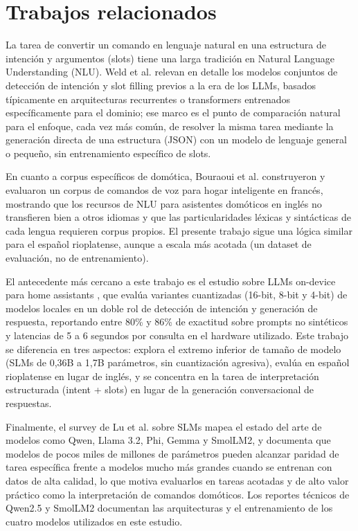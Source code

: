 \section{Trabajos relacionados}

La tarea de convertir un comando en lenguaje natural en una estructura de
intención y argumentos (slots) tiene una larga tradición en Natural Language
Understanding (NLU). Weld et al. \cite{weld2023survey} relevan en detalle
los modelos conjuntos de detección de intención y slot filling previos a la
era de los LLMs, basados típicamente en arquitecturas recurrentes o
transformers entrenados específicamente para el dominio; ese marco es el
punto de comparación natural para el enfoque, cada vez más común, de
resolver la misma tarea mediante la generación directa de una estructura
(JSON) con un modelo de lenguaje general o pequeño, sin entrenamiento
específico de slots.

En cuanto a corpus específicos de domótica, Bouraoui et al.
\cite{bouraoui2018french} construyeron y evaluaron un corpus de comandos de
voz para hogar inteligente en francés, mostrando que los recursos de NLU
para asistentes domóticos en inglés no transfieren bien a otros idiomas y
que las particularidades léxicas y sintácticas de cada lengua requieren
corpus propios. El presente trabajo sigue una lógica similar para el
español rioplatense, aunque a escala más acotada (un dataset de evaluación,
no de entrenamiento).

El antecedente más cercano a este trabajo es el estudio sobre LLMs
on-device para home assistants \cite{ondevice2025homeassistant}, que evalúa
variantes cuantizadas (16-bit, 8-bit y 4-bit) de modelos locales en un doble
rol de detección de intención y generación de respuesta, reportando entre
80\% y 86\% de exactitud sobre prompts no sintéticos y latencias de 5 a 6
segundos por consulta en el hardware utilizado. Este trabajo se diferencia
en tres aspectos: explora el extremo inferior de tamaño de modelo (SLMs de
0,36B a 1,7B parámetros, sin cuantización agresiva), evalúa en español
rioplatense en lugar de inglés, y se concentra en la tarea de interpretación
estructurada (intent + slots) en lugar de la generación conversacional de
respuestas.

Finalmente, el survey de Lu et al. \cite{gupta2025slms} sobre SLMs mapea el
estado del arte de modelos como Qwen, Llama 3.2, Phi, Gemma y SmolLM2, y
documenta que modelos de pocos miles de millones de parámetros pueden
alcanzar paridad de tarea específica frente a modelos mucho más grandes
cuando se entrenan con datos de alta calidad, lo que motiva evaluarlos en
tareas acotadas y de alto valor práctico como la interpretación de comandos
domóticos. Los reportes técnicos de Qwen2.5 \cite{qwen2024report} y SmolLM2
\cite{allal2024smollm2} documentan las arquitecturas y el entrenamiento de
los cuatro modelos utilizados en este estudio.

